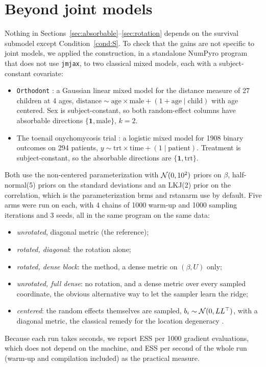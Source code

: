 \section{Beyond joint models}\label{sec:generality}

Nothing in Sections~\ref{sec:absorbable}--\ref{sec:rotation} depends on
the survival submodel except Condition~\ref{cond:S}. To check that the
gains are not specific to joint models, we applied the construction, in a
standalone NumPyro program that does not use \texttt{jmjax}, to two
classical mixed models, each with a subject-constant covariate:
\begin{itemize}
\item \texttt{Orthodont} \citep{potthoff1964,pinheiro2000}: a Gaussian
linear mixed model for the distance measure of 27 children at 4 ages,
$\text{distance} \sim \text{age} \times \text{male} + (1 + \text{age} \mid
\text{child})$ with age centered. Sex is subject-constant, so both
random-effect columns have absorbable directions $\{\mathbf{1},
\mathrm{male}\}$, $k = 2$.
\item The toenail onychomycosis trial \citep{debacker1998,lesaffre2001}: a
logistic mixed model for 1908 binary outcomes on 294 patients, $y \sim
\text{trt} \times \text{time} + (1 \mid \text{patient})$. Treatment is
subject-constant, so the absorbable directions are $\{\mathbf{1},
\mathrm{trt}\}$.
\end{itemize}
Both use the non-centered parameterization with $\mathcal{N}(0, 10^2)$ priors on
$\beta$, half-normal(5) priors on the standard deviations and an LKJ(2)
prior on the correlation, which is the parameterization brms and rstanarm
use by default. Five arms were run on each, with 4 chains of 1000 warm-up
and 1000 sampling iterations and 3 seeds, all in the same program on the
same data:
\begin{itemize}
\item \emph{unrotated}, diagonal metric (the reference);
\item \emph{rotated, diagonal}: the rotation alone;
\item \emph{rotated, dense block}: the method, a dense metric on $(\beta,
U)$ only;
\item \emph{unrotated, full dense}: no rotation, and a dense metric over
every sampled coordinate, the obvious alternative way to let the sampler
learn the ridge;
\item \emph{centered}: the random effects themselves are sampled, $b_i \sim
\mathcal{N}(0, LL^{\top})$, with a diagonal metric, the classical remedy for the
location degeneracy \citep{gelfand1995}.
\end{itemize}
Because each run takes seconds, we report ESS per 1000 gradient
evaluations, which does not depend on the machine, and ESS per second of
the whole run (warm-up and compilation included) as the practical measure.

